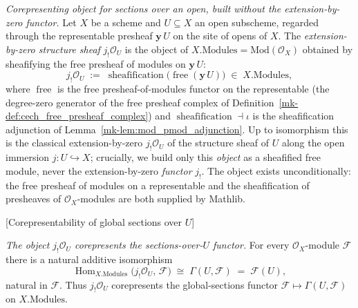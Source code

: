 \begin{definition}\label{mk-def:jshriek_ou}
  \leanok

  \textit{Corepresenting object for sections over an open, built without the
  extension-by-zero functor.}
  Let \(X\) be a scheme and \(U \subseteq X\) an open subscheme, regarded through the
  representable presheaf \(\mathbf{y}\,U\) on the site of opens of \(X\). The
  \emph{extension-by-zero structure sheaf} \(j_!\mathcal{O}_U\) is the object of
  \(X.\mathrm{Modules} = \mathrm{Mod}(\mathcal{O}_X)\) obtained by sheafifying the free
  presheaf of modules on \(\mathbf{y}\,U\):
  \[
    j_!\mathcal{O}_U \;:=\; \operatorname{sheafification}\bigl(
      \operatorname{free}(\mathbf{y}\,U)\bigr)
    \;\in\; X.\mathrm{Modules},
  \]
  where \(\operatorname{free}\) is the free presheaf-of-modules functor on the
  representable (the degree-zero generator of the free presheaf complex of
  Definition~\ref{mk-def:cech_free_presheaf_complex}) and
  \(\operatorname{sheafification} \dashv \iota\) is the sheafification adjunction of
  Lemma~\ref{mk-lem:mod_pmod_adjunction}. Up to isomorphism this is the classical
  extension-by-zero \(j_!\mathcal{O}_U\) of the structure sheaf of \(U\) along the open
  immersion \(j : U \hookrightarrow X\); crucially, we build only this \emph{object} as a
  sheafified free module, never the extension-by-zero \emph{functor} \(j_!\). The object
  exists unconditionally: the free presheaf of modules on a representable and the
  sheafification of presheaves of \(\mathcal{O}_X\)-modules are both supplied by Mathlib.
\end{definition}

\begin{lemma}

[Corepresentability of global sections over \(U\)]
  \label{mk-lem:jshriek_corepr}

  \textit{The object \(j_!\mathcal{O}_U\) corepresents the sections-over-\(U\) functor.}
  For every \(\mathcal{O}_X\)-module \(\mathcal{F}\) there is a natural additive
  isomorphism
  \[
    \operatorname{Hom}_{X.\mathrm{Modules}}\bigl(j_!\mathcal{O}_U,\, \mathcal{F}\bigr)
    \;\cong\;
    \Gamma(U, \mathcal{F}) \;=\; \mathcal{F}(U),
  \]
  natural in \(\mathcal{F}\). Thus \(j_!\mathcal{O}_U\) corepresents the global-sections
  functor \(\mathcal{F} \mapsto \Gamma(U, \mathcal{F})\) on \(X.\mathrm{Modules}\).
\end{lemma}

